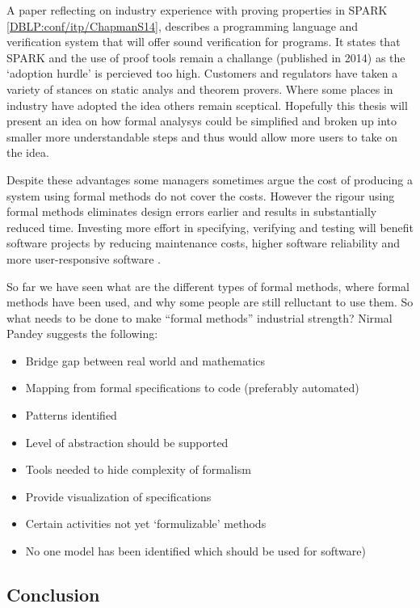A paper reflecting on industry experience with proving properties in SPARK \ref{DBLP:conf/itp/ChapmanS14}, describes a programming language and verification system that will offer sound verification for programs. It states that SPARK and the use of proof tools remain a challange (published in 2014) as the `adoption hurdle' is percieved too high. Customers and regulators have taken a variety of stances on static analys and theorem provers. Where some places in industry have adopted the idea others remain sceptical. Hopefully this thesis will present an idea on how formal analysys could be simplified and broken up into smaller more understandable steps and thus would allow more users to take on the idea.

Despite these advantages some managers sometimes argue the cost of producing a system using formal methods do not cover the costs. However the rigour using formal methods eliminates design errors earlier and results in substantially reduced time. Investing more effort in specifying, verifying and testing will benefit software projects by reducing maintenance costs, higher software reliability and more user-responsive software \cite{chantatub}.

So far we have seen what are the different types of formal methods, where formal methods have been used, and why some people are still relluctant to use them. So what needs to be done to make “formal methods” industrial strength? Nirmal Pandey \cite{formalmethodslides} suggests the following: 

\begin{itemize}
\item Bridge gap between real world and mathematics
\item Mapping from formal specifications to code (preferably automated)
\item Patterns identified
\item Level of abstraction should be supported
\item Tools needed to hide complexity of formalism
\item Provide visualization of specifications 
\item Certain activities not yet ‘formulizable’ methods
\item No one model has been identified which should be used for software)
\end{itemize}


\subsection{Conclusion}

